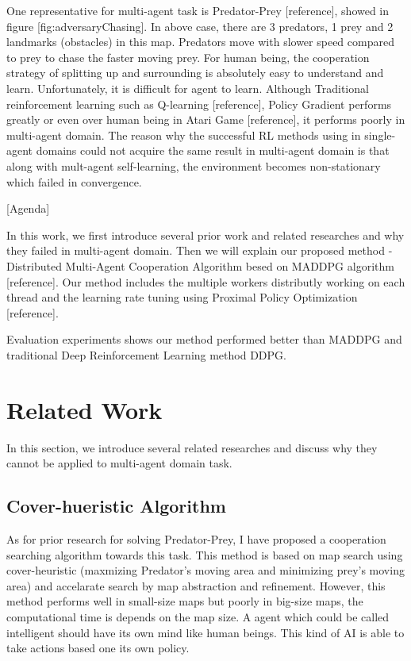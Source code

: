 \documentclass[11pt,twocolumn]{jarticle} %
\begin{document}
One representative for multi-agent task is Predator-Prey [reference], showed in figure [fig:adversaryChasing]. In above case, there are 
3 predators, 1 prey and 2 landmarks (obstacles) in this map. Predators move with slower speed compared to prey to chase the faster moving prey. For human being, the cooperation strategy of splitting up and surrounding is absolutely easy to understand and learn. Unfortunately, it is difficult for agent to learn. Although Traditional reinforcement learning such as Q-learning [reference], Policy Gradient performs greatly or even over human being in Atari Game [reference], it performs poorly in multi-agent domain. The reason why the successful RL methods using in single-agent domains could not acquire the same result in multi-agent domain is that along with mult-agent self-learning, the environment becomes non-stationary which failed in convergence. \par

[Agenda] \par
In this work, we first introduce several prior work and related researches and why they failed in multi-agent domain. Then we will explain our proposed method - Distributed Multi-Agent Cooperation Algorithm besed on MADDPG algorithm [reference]. Our method includes the multiple workers distributly working on each thread and the learning rate tuning using Proximal Policy Optimization [reference]. \par

Evaluation experiments shows our method performed better than MADDPG and traditional Deep Reinforcement Learning method DDPG. \par

\section{Related Work} 
In this section, we introduce several related researches and discuss why they cannot be applied to multi-agent domain task.
\subsection{Cover-hueristic Algorithm}
As for prior research for solving Predator-Prey, I have proposed a cooperation searching algorithm towards this task. This method is based on map search using cover-heuristic (maxmizing Predator's moving area and minimizing prey's moving area) and accelarate search by map abstraction and refinement. However, this method performs well in small-size maps but poorly in big-size maps, the computational time is depends on the map size. A agent which could be called intelligent should have its own mind like human beings. This kind of AI is able to take actions based one its own policy.\par
\end{document}
